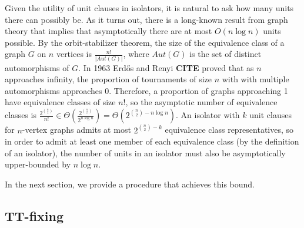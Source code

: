 \documentclass[conference]{IEEEtran}
\begin{document}
Given the utility of unit clauses in isolators, it is natural to ask how many units there can possibly be. As it turns out, there is a long-known result from graph theory that implies that asymptotically there are at most $O(n\log n)$ units possible. By the orbit-stabilizer theorem, the size of the equivalence class of a graph $G$ on $n$ vertices is $\frac{n!}{|Aut(G)|}$, where $Aut(G)$ is the set of distinct automorphisms of $G$. In 1963 Erd\H{o}s and Renyi \textbf{CITE} proved that as $n$ approaches infinity, the proportion of tournaments of size $n$ with with multiple automorphisms approaches 0. Therefore, a proportion of graphs approaching 1 have equivalence classes of size $n!$, so the asymptotic number of equivalence classes is $\frac{2^{n \choose 2}}{n!} \in \Theta(\frac{2^{n \choose 2}}{2^{n\log n}}) = \Theta(2^{{n \choose 2} - n\log n})$. An isolator with $k$ unit clauses for $n$-vertex graphs admits at most $2^{{n \choose 2} - k}$ equivalence class representatives, so in order to admit at least one member of each equivalence class (by the definition of an isolator), the number of units in an isolator must also be asymptotically upper-bounded by $n \log n$.

In the next section, we provide a procedure that achieves this bound.

\subsection{TT-fixing}
\end{document}

